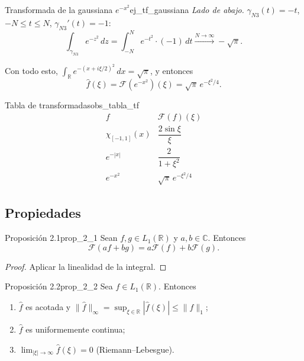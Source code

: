 \begin{ejemplo}{Transformada de la gaussiana $e^{-x^2}$}{ej_tf_gaussiana}
\emph{Lado de abajo.} $\gamma_{N3}(t) = -t$, $-N \le t \le N$, $\gamma_{N3}'(t) = -1$:
\[
\int_{\gamma_{N3}}e^{-z^2}\,dz = \int_{-N}^{N}e^{-t^2}\cdot(-1)\,dt \xrightarrow{N\to\infty} -\sqrt{\pi}.
\]

Con todo esto, $\int_{\mathbb{R}}e^{-(x+i\xi/2)^2}\,dx = \sqrt{\pi}$, y entonces
\[
\hat{f}(\xi) = \mathcal{F}(e^{-x^2})(\xi) = \sqrt{\pi}\,e^{-\xi^2/4}.
\]
\end{ejemplo}

\begin{observacion}{Tabla de transformadas}{obs_tabla_tf}
\[
\begin{array}{c|c}
f & \mathcal{F}(f)(\xi) \\ \hline
\chi_{[-1,1]}(x) & \dfrac{2\sin\xi}{\xi} \\[8pt]
e^{-|x|} & \dfrac{2}{1+\xi^2} \\[8pt]
e^{-x^2} & \sqrt{\pi}\,e^{-\xi^2/4}
\end{array}
\]
\end{observacion}

\subsection{Propiedades}

\begin{proposicion}{Proposición 2.1}{prop_2_1}
Sean $f, g \in L_1(\mathbb{R})$ y $a, b \in \mathbb{C}$. Entonces
\[
\mathcal{F}(af + bg) = a\mathcal{F}(f) + b\mathcal{F}(g).
\]
\end{proposicion}

\begin{proof}
Aplicar la linealidad de la integral.
\end{proof}

\begin{proposicion}{Proposición 2.2}{prop_2_2}
Sea $f \in L_1(\mathbb{R})$. Entonces
\begin{enumerate}
\item[(1)] $\hat{f}$ es acotada y $\|\hat{f}\|_\infty = \sup_{\xi\in\mathbb{R}}|\hat{f}(\xi)| \le \|f\|_1$;
\item[(2)] $\hat{f}$ es uniformemente continua;
\item[(3)] $\lim_{|\xi|\to\infty}\hat{f}(\xi) = 0$ (Riemann--Lebesgue).
\end{enumerate}
\end{proposicion}

